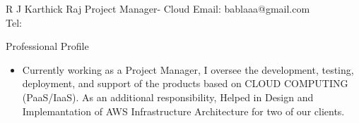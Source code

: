 \documentclass[a4paper,12pt]{article}
\begin{document}
\setmainfont



\vspace*{3\baselineskip}

\header
{R J Karthick Raj}
{Project Manager- Cloud}
{Email: bablaaa@gmail.com\\
Tel: }
\newline
\newline
\newline

\begin{resumesummary}{Professional Profile}
\begin{itemize}      
  \item Currently working as a Project Manager, I oversee the development, testing, deployment, and support of the products based on CLOUD COMPUTING (PaaS/IaaS). As an additional responsibility, Helped in Design and Implemantation of AWS Infrastructure Architecture for two of our clients.
\newline
\newline
\newline
\end{itemize}
\end{resumesummary}

\end{document}
